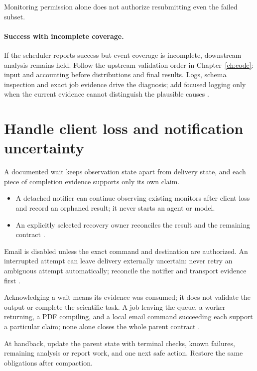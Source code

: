 \begin{rulebox}[Resubmission]
  Monitoring permission alone does not authorize resubmitting even the failed subset.
\end{rulebox}

\paragraph{Success with incomplete coverage.} If the scheduler reports success but event
coverage is incomplete, downstream analysis remains held. Follow the upstream validation
order in Chapter~\ref{ch:code}: input and accounting before distributions and final
results. Logs, schema inspection and exact job evidence drive the diagnosis; add focused
logging only when the current evidence cannot distinguish the plausible causes
\cite[Validation order]{skill:implementation}.

\section{Handle client loss and notification uncertainty}

\begin{headline}
  A documented wait keeps observation state apart from delivery state, and each piece of
  completion evidence supports only its own claim.
\end{headline}

\begin{itemize}
  \item A detached notifier can continue observing existing monitors after client loss and record
        an orphaned result; it never starts an agent or model.
  \item An explicitly selected recovery owner reconciles the result and the remaining contract
        \cite[Client loss and notification; Compaction and recovery]{skill:jobs}.
\end{itemize}

\begin{rulebox}[Notification]
  Email is disabled unless the exact command and destination are authorized. An
  interrupted attempt can leave delivery externally uncertain: never retry an ambiguous
  attempt automatically; reconcile the notifier and transport evidence first
  \cite[Client loss and notification]{skill:jobs}.
\end{rulebox}

Acknowledging a wait means its evidence was consumed; it does not validate the output or
complete the scientific task. A job leaving the queue, a worker returning, a PDF
compiling, and a local email command succeeding each support a particular claim; none
alone closes the whole parent contract \cite[Completion evidence]{skill:jobs}.

At handback, update the parent state with terminal checks, known failures, remaining
analysis or report work, and one next safe action. Restore the same obligations after
compaction.
